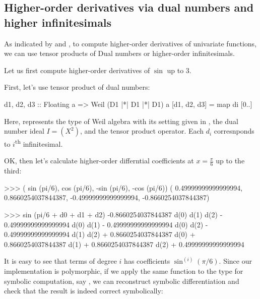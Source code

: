 \documentclass[%
  sigconf,authorversion,screen]{acmart}
\begin{document}
\subsection{Higher-order derivatives via dual numbers and higher infinitesimals}
As indicated by  and ,
to compute higher-order derivatives of univariate functions, we can use tensor products of Dual numbers or higher-order infinitesimals.

Let us first compute higher-order derivatives of $\sin$ up to $3$.

First, let's use tensor product of dual numbers:
\begin{code}
d1, d2, d3
  :: Floating a
  => Weil (D1 |*| D1 |*| D1) a
[d1, d2, d3] = map di [0..]
\end{code}

Here,  represents the type of Weil algebra with its setting given in ,  the dual number ideal $I = (X^2)$, and \hask{|*|} the tensor product operator.
Each $d_i$ corresnponds to $i$\textsuperscript{th} infinitesimal.

OK, then let's calculate higher-order differntial coefficients at $x = \frac{\pi}{6}$ up to the third:

\begin{code}
>>> ( sin (pi/6),  cos (pi/6), 
     -sin (pi/6), -cos (pi/6))
( 0.49999999999999994,
  0.8660254037844387,
 -0.49999999999999994,
 -0.8660254037844387)

>>> sin (pi/6 + d0 + d1 + d2)
-0.8660254037844387 d(0) d(1) d(2) 
  - 0.49999999999999994 d(0) d(1) 
  - 0.49999999999999994 d(0) d(2)
  - 0.49999999999999994 d(1) d(2) 
  + 0.8660254037844387 d(0) 
  + 0.8660254037844387 d(1) 
  + 0.8660254037844387 d(2) 
  + 0.49999999999999994
\end{code}

It is easy to see that terms of degree $i$ has coefficients $\sin^{(i)}(\pi/6)$.
Since our implementation is polymorphic, if we apply the same function to the type for symbolic computation, say , we can reconstruct symbolic differentiation and check that the result is indeed correct symbolically:

\end{document}

